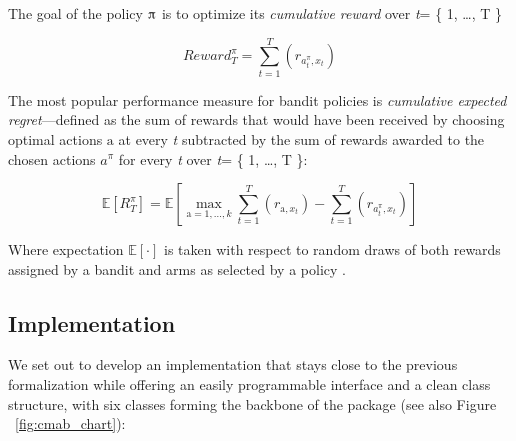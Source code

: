 \documentclass{jss}\usepackage[]{graphicx}\usepackage[]{color}
\begin{document}
The goal of the policy $\piup$ is to optimize its \textit{cumulative reward} over \emph{t}= \{ 1, \ldots, T \}

\begin{equation} \label{eq:1}
Reward^{\pi}_{T} = \sum^{T}_{t=1}(r_{a^{\pi}_t,x_t})
\end{equation}

The most popular performance measure for bandit policies \citep{Kuleshov2014} is \textit{cumulative expected regret}---defined as the sum of rewards that would have been received by choosing optimal actions $\mathrm{a}$ at every \emph{t} subtracted by the sum of rewards awarded to the chosen actions $a^{\pi}$ for every \emph{t} over \emph{t}= \{ 1, \ldots, T \}:

\begin{equation} \label{eq:2}
\mathbb{E}\left[R^{\pi}_{T} \right] = \mathbb{E}\left[  \max_{\mathrm{a} = 1, \dots, k} \sum^{T}_{t=1}(r_{\mathrm{a},x_t}) - \sum^{T}_{t=1}(r_{a^{\pi}_t,x_t})\right]
\end{equation}

Where expectation $\mathbb{E}\left[ \mathord{\cdot}\right]$ is taken with respect to random draws of both rewards assigned by a bandit and arms as selected by a policy \citep{Zheng2016a}.

\subsection{Implementation}

We set out to develop an implementation that stays close to the previous formalization while offering an easily programmable interface and a clean class structure, with six classes forming the backbone of the package (see also Figure ~\ref{fig:cmab_chart}):
\end{document}
